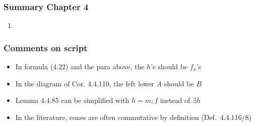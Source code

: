\documentclass[handout]{beamer}
\begin{document}
\frame
  {   
    \frametitle{Summary Chapter 4}\label{Ch4:Summary}

 \begin{enumerate}[<+->]
\item 
 \end{enumerate}

}

\frame
  {   
    \frametitle{Comments on script}\label{Ch4:comments}

 \begin{itemize}[<+->]
\item In formula (4.22) and the para above, the $h$'s should be $f_x$'s
\item In the diagram of Cor. 4.4.110, the left lower $A$ should be $B$
\item Lemma 4.4.85 can be simplified with $h = m;f$ instead of $\exists h$
\item In the literature, cones are often commutative by definition (Def.\ 4.4.116/8)
 \end{itemize}

 }
\end{document}
